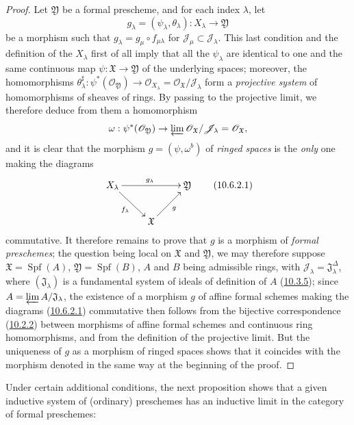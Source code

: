 \begin{proof}
Let $\mathfrak{Y}$ be a formal prescheme, and for each index $\lambda$,
let
\[
  g_\lambda=(\psi_\lambda,\theta_\lambda):X_\lambda\to\mathfrak{Y}
\]
be a morphism such that
$g_\lambda=g_\mu\circ f_{\mu\lambda}$ for
$\mathscr{J}_\mu\subset\mathscr{J}_\lambda$. This last condition
and the definition of the $X_\lambda$ first of all imply that all the
$\psi_\lambda$ are identical to one and the same continuous map
$\psi:\mathfrak{X}\to\mathfrak{Y}$ of the underlying spaces; moreover,
the homomorphisms
$\theta_\lambda^\sharp:\psi^*(\mathscr{O}_{\mathfrak{Y}})\to
\mathscr{O}_{X_\lambda}=
\mathscr{O}_{\mathfrak{X}}/\mathscr{J}_\lambda$ form a
\emph{projective system} of homomorphisms of sheaves of rings. By
passing to the projective limit, we therefore deduce from them a
homomorphism
\[
  \omega:\psi^*(\mathscr{O}_{\mathfrak{Y}})\to
  \varprojlim\mathscr{O}_{\mathfrak{X}}/\mathscr{J}_\lambda
  =\mathscr{O}_{\mathfrak{X}},
\]
and it is clear that the morphism $g=(\psi,\omega^b)$ of \emph{ringed
spaces} is the \emph{only} one making the diagrams
\[
  \label{I.10.6.2.1}
  \xymatrix{
    X_\lambda\ar[rr]^{g_\lambda}\ar[rd]_{f_\lambda} &&
    \mathfrak{Y}\\
    & \mathfrak{X}\ar[ru]_g
  }
  \tag{10.6.2.1}
\]
commutative. It therefore remains to prove that $g$ is a morphism of
\emph{formal preschemes}; the question being local on $\mathfrak{X}$ and
$\mathfrak{Y}$, we may therefore suppose
$\mathfrak{X}=\operatorname{Spf}(A)$,
$\mathfrak{Y}=\operatorname{Spf}(B)$, $A$ and $B$ being admissible
rings, with
$\mathscr{J}_\lambda=\mathfrak{J}_\lambda^{\Delta}$, where
$(\mathfrak{J}_\lambda)$ is a fundamental system of ideals of
definition of $A$ (\hyperref[I.10.3.5]{10.3.5}); since
$A=\varprojlim A/\mathfrak{J}_\lambda$, the existence of a morphism $g$
of affine formal schemes making the diagrams
(\hyperref[I.10.6.2.1]{10.6.2.1}) commutative then follows from the
bijective correspondence (\hyperref[I.10.2.2]{10.2.2}) between
morphisms of affine formal schemes and continuous ring homomorphisms,
and from the definition of the projective limit. But the uniqueness of
$g$ as a morphism of ringed spaces shows that it coincides with the
morphism denoted in the same way at the beginning of the proof.
\end{proof}

Under certain additional conditions, the next proposition shows that a given
inductive system of (ordinary) preschemes has an inductive limit in the
category of formal preschemes:

